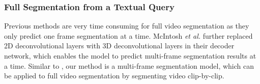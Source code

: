 \documentclass[journal]{IEEEtran}
\begin{document}
\subsubsection{Full Segmentation from a Textual Query}

Previous methods \cite{gavrilyuk2018actor,wang2019asymmetric,wang2020context} are very time consuming for full video segmentation as they only predict one frame segmentation at a time. McIntosh \emph{et al.} \cite{mcintosh2018multi} further replaced 2D deconvolutional layers with 3D deconvolutional layers in their decoder network, which enables the model to predict multi-frame segmentation results at a time. Similar to \cite{mcintosh2018multi}, our method is a multi-frame segmentation model, which can be applied to full video segmentation by segmenting video clip-by-clip.

\begin{table}[!tb]
\begin{threeparttable}
\caption{Comparison with state-of-the-art referring expression segmentation methods}
\label{table:referseg}
\centering
{}
\end{threeparttable}
\vspace{-0.1cm}
\end{table}
\end{document}
